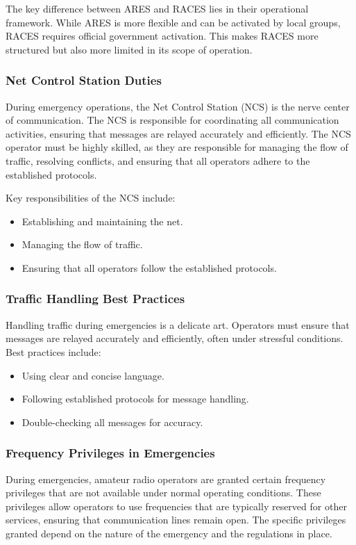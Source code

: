 The key difference between ARES and RACES lies in their operational framework. While ARES is more flexible and can be activated by local groups, RACES requires official government activation. This makes RACES more structured but also more limited in its scope of operation.

\subsubsection*{Net Control Station Duties}
During emergency operations, the Net Control Station (NCS) is the nerve center of communication. The NCS is responsible for coordinating all communication activities, ensuring that messages are relayed accurately and efficiently. The NCS operator must be highly skilled, as they are responsible for managing the flow of traffic, resolving conflicts, and ensuring that all operators adhere to the established protocols.

Key responsibilities of the NCS include:
\begin{itemize}
    \item Establishing and maintaining the net.
    \item Managing the flow of traffic.
    \item Ensuring that all operators follow the established protocols.
\end{itemize}

\subsubsection*{Traffic Handling Best Practices}
Handling traffic during emergencies is a delicate art. Operators must ensure that messages are relayed accurately and efficiently, often under stressful conditions. Best practices include:
\begin{itemize}
    \item Using clear and concise language.
    \item Following established protocols for message handling.
    \item Double-checking all messages for accuracy.
\end{itemize}

\subsubsection*{Frequency Privileges in Emergencies}
During emergencies, amateur radio operators are granted certain frequency privileges that are not available under normal operating conditions. These privileges allow operators to use frequencies that are typically reserved for other services, ensuring that communication lines remain open. The specific privileges granted depend on the nature of the emergency and the regulations in place.

